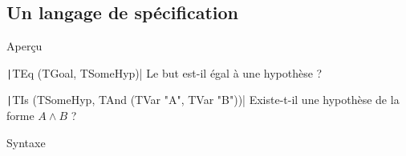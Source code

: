 \documentclass[french,usepdftitle=false,compress]{beamer}
\begin{document}


\subsection{Un langage de spécification}
\begin{frame}{Aperçu}
  \begin{block}{\texttt|TEq (TGoal, TSomeHyp)|}
    Le but est-il égal à une hypothèse ?
  \end{block}

  \begin{block}{\texttt|TIs (TSomeHyp, TAnd (TVar "A", TVar "B"))|}
    Existe-t-il une hypothèse de la forme $A \land B$ ?
  \end{block}
\end{frame}

\begin{frame}{Syntaxe}
  \inputminted[fontsize=\small]{ocaml}{syntax_var.ml}
  \vfill
  \inputminted[fontsize=\small]{ocaml}{syntax_form.ml}
  \vfill
  \inputminted[fontsize=\small]{ocaml}{syntax.ml}
\end{frame}
\end{document}
